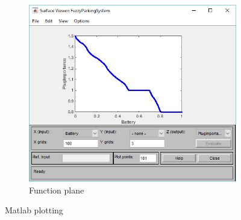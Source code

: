 \begin{figure}
	\begin{subfigure}{\textwidth}
		\includegraphics[width=.5\textwidth, center]{img/Fuzzy/output.PNG}
		\caption{Function plane}
		\label{fig:subim3}
	\end{subfigure}
	
	\caption{Matlab plotting}
	\label{fig:image1}
\end{figure}